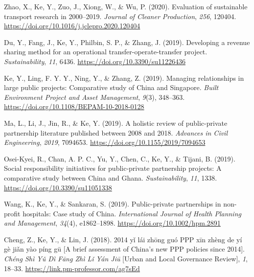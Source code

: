 \documentclass[11pt,a4paper]{report} %
\begin{document}
\begin{tablist}
        \item[2020] \tab{}Zhao, X., Ke, Y., Zuo, J., Xiong, W., \& Wu, P. (2020). Evaluation of sustainable transport research in 2000--2019. \textit{Journal of Cleaner Production}, \textit{256}, 120404. \href{https://doi.org/10.1016/j.jclepro.2020.120404}{https://doi.org/10.1016/j.jclepro.2020.120404}
        
        \item[2019] \tab{}Du, Y., Fang, J., Ke, Y., Philbin, S. P., \& Zhang, J. (2019). Developing a revenue sharing method for an operational transfer-operate-transfer project. \textit{Sustainability}, \textit{11}, 6436. \href{https://doi.org/10.3390/su11226436}{https://doi.org/10.3390/su11226436}
        
        \item[2019] \tab{}Ke, Y., Ling, F. Y. Y., Ning, Y., \& Zhang, Z. (2019). Managing relationships in large public projects: Comparative study of China and Singapore. \textit{Built Environment Project and Asset Management}, \textit{9}(3), 348--363. \href{https://doi.org/10.1108/BEPAM-10-2018-0128}{https://doi.org/10.1108/BEPAM-10-2018-0128}
        
        \item[2019] \tab{}Ma, L., Li, J., Jin, R., \& Ke, Y. (2019). A holistic review of public-private partnership literature published between 2008 and 2018. \textit{Advances in Civil Engineering}, \textit{2019}, 7094653. \href{https://doi.org/10.1155/2019/7094653}{https://doi.org/10.1155/2019/7094653}
        
        \item[2019] \tab{}Osei-Kyei, R., Chan, A. P. C., Yu, Y., Chen, C., Ke, Y., \& Tijani, B. (2019). Social responsibility initiatives for public-private partnership projects: A comparative study between China and Ghana. \textit{Sustainability}, \textit{11}, 1338. \href{https://doi.org/10.3390/su11051338}{https://doi.org/10.3390/su11051338}

        \item[2019] \tab{}Wang, K., Ke, Y., \& Sankaran, S. (2019). Public-private partnerships in non-profit hospitals: Case study of China. \textit{International Journal of Health Planning and Management}, \textit{34}(4), e1862--1898. \href{https://doi.org/10.1002/hpm.2891}{https://doi.org/10.1002/hpm.2891}
        
        \item[2018] \tab{}Cheng, Z., Ke, Y., \& Lin, J. (2018). 2014 yǐ lái zhōng guó PPP xīn zhèng de yí gè jiǎn yào píng gū [A brief assessment of China's new PPP policies since 2014]. \textit{Chéng Shì Yǔ Dì Fāng Zhì Lǐ Yán Jiū} [Urban and Local Governance Review], \textit{1}, 18--33. \href{https://link.pm-professor.com/ag7sEd}{https://link.pm-professor.com/ag7sEd}
        

\end{tablist}
\end{document}
